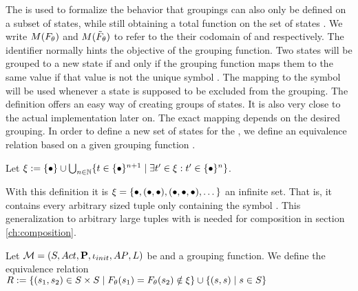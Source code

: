 \documentclass[preview]{standalone}
\begin{document}
The \grpfctsubN is used to formalize the behavior that groupings can also only be defined on a subset of states, while still obtaining a total function on the set of states \states. We write $M({F_{{\theta}}})$ and $M({\tilde{F}_{{\theta}}})$ to refer to the their codomain of \grpfct and \grpfctsub respectively. The identifier \viewppty normally hints the objective of the grouping function. Two states will be grouped to a new state if and only if the grouping function maps them to the same value if that value is not the unique symbol \remelem. The mapping to the symbol \remelem will be used whenever a state is supposed to be excluded from the grouping. The definition offers an easy way of creating groups of states. It is also very close to the actual implementation later on. The exact mapping depends on the desired grouping. In order to define a new set of states for the \viewN, we define an equivalence relation \eqrelview based on a given grouping function \grpfct.

\begin{definition}
	Let ${\xi} := \{{\bullet}\} \cup \bigcup_{n \in {\mathbb{N}}} \{t \in \{{\bullet}\}^{n+1} \mid \exists t'\in {\xi} : t' \in \{{\bullet}\}^n\}$.
\end{definition}

With this definition it is ${\xi} = \{{\bullet}, ({\bullet}, {\bullet}), ({\bullet}, {\bullet}, {\bullet}), \dots\}$ an infinite set. That is, it contains every arbitrary sized tuple only containing the symbol \remelem. This generalization to arbitrary large tuples with \remelem is needed for composition in section \ref{ch:composition}.

\begin{definition}
	Let ${{{\mathcal{M}}}} = {{({S}, {Act}, {\textbf{P}}, {\iota_{init}}, {AP}, {L})}}$ be \achgphN and \grpfct a grouping function. We define the equivalence relation ${R} :=\{ ({s}_1, {s}_2) \in {S} \times {S} \mid {F_{\ensuremath{{\theta}}}}({s}_1) = {F_{{\theta}}}({s}_2) \notin {\xi}\} \cup \{({s}, {s})  \mid {s} \in {S}\}$
	
	\label{def:eqrelview}
\end{definition}
\end{document}
